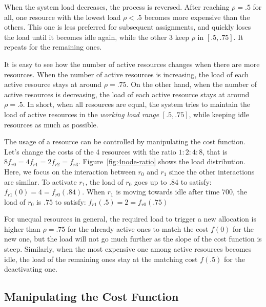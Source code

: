 When the system load decreases, the process is reversed.
After reaching $\rho = .5$ for all,
one resource with the lowest load $\rho < .5$ becomes more expensive
than the others.
This one is less preferred for subsequent assignments, and quickly
loses the load until it becomes idle again, while the other 3 keep
$\rho$ in $[.5, .75]$. It repeats for the remaining ones.

It is easy to see how the number of active resources changes when
there are more resources.
When the number of active resources is increasing, the load of each
active resource stays at around $\rho = .75$.
On the other hand, when the number of active resources is decreasing,
the load of each active resource stays at around $\rho = .5$.
In short, when all resources are equal, the system tries to maintain
the load of active resources in the {\em working load range}
$[.5, .75]$, while keeping idle resources as much as possible.

The usage of a resource can be controlled by manipulating the cost
function.
Let's change the costs of the 4 resources with the ratio $1:2:4:8$,
that is $8 f_{r0} = 4 f_{r1} = 2 f_{r2} = f_{r3}$.
Figure~\ref{fig:4node-ratio} shows the load distribution.
Here, we focus on the interaction between $r_{0}$ and $r_{1}$ since
the other interactions are similar.
To activate $r_{1}$, the load of $r_{0}$ goes up to $.84$ to satisfy:
$f_{r1}(0) = 4 = f_{r0}(.84)$.
When $r_{1}$ is moving towards idle after time 700, the load
of $r_{0}$ is $.75$ to satisfy: $f_{r1}(.5) = 2 = f_{r0}(.75)$

For unequal resources in general, the required load to trigger a new
allocation is higher than $\rho = .75$ for the already
active ones to match the cost $f(0)$ for the new one, but the load
will not go much further as the slope of the cost function is steep.
Similarly, when the most expensive one among active resources becomes
idle, the load of the remaining ones stay at the matching cost
$f(.5)$ for the deactivating one.


\subsection{Manipulating the Cost Function}
\label{sec:variation}

